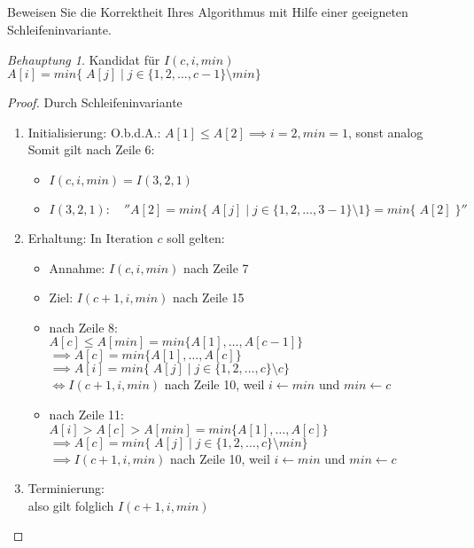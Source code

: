 \documentclass[12pt]{article}
\theoremstyle{remark}
\newtheorem*{Behauptung}{Behauptung}
\begin{document}
\subsection{} Beweisen Sie die Korrektheit Ihres Algorithmus mit Hilfe einer geeigneten Schleifeninvariante.

\begin{Behauptung}

Kandidat für $I(c,i,min)$ \\
$A[i] = min\{\; A[j] \;| \; j \in \{1,2, \ldots, c - 1\}\setminus min\}$
\end{Behauptung}

\begin{proof}
Durch Schleifeninvariante
\begin{enumerate}
    \item Initialisierung:
    O.b.d.A.: $A[1] \leq A[2] \implies i=2, min = 1$, sonst analog\\
    Somit gilt nach Zeile 6:
    \begin{itemize}
        \item $I(c, i, min) = I(3, 2, 1)$
        \item $I(3,2,1): \quad ''A[2] = min\{\; A[j] \;| \; j \in \{1,2, \ldots, 3 - 1\}\setminus 1\}=min\{\; A[2] \;\}''$
    \end{itemize}

    \item Erhaltung:
    In Iteration $c$ soll gelten:
    \begin{itemize}
        \item Annahme: $I(c, i, min)$ nach Zeile 7
        \item Ziel: $I(c+1, i, min)$ nach Zeile 15
        \item nach Zeile 8: \\
           $A[c] \leq A[min] = min\{A[1], \ldots, A[c-1]\}$ \\
           $\implies A[c] = min\{A[1],\ldots, A[c]\}$ \\
           $\implies A[i] = min\{\; A[j] \;| \; j \in \{1,2, \ldots, c\}\setminus c\}$\\
           $\iff I(c+1, i, min)$ nach Zeile 10, weil $i \gets min$ und $min \gets c$
       \item nach Zeile 11: \\
           $A[i] > A[c] > A[min] = min\{A[1], \ldots, A[c]\}$ \\
           $\implies A[c] = min\{\; A[j] \;| \; j \in \{1,2, \ldots, c\}\setminus min\}$\\
           $\implies I(c+1, i, min)$ nach Zeile 10, weil $i \gets min$ und $min \gets c$
    \end{itemize}
    \item Terminierung: \\
    also gilt folglich $I(c+1, i, min)$
\end{enumerate}
\end{proof}
\end{document}
